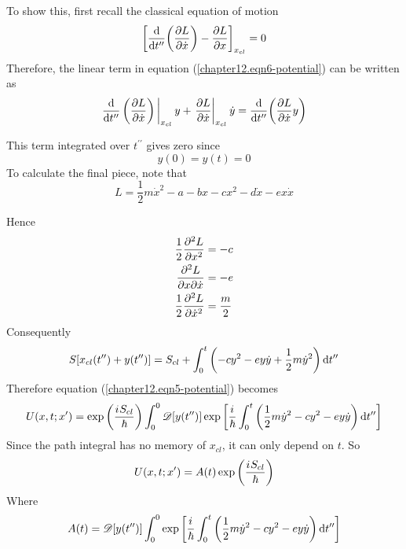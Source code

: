 		To show this, first recall the classical equation of motion
		\begin{equation}
			\left[
			\dv{t^{\prime\prime}} \qty(\pdv{L}{\dot{x}}) - \pdv{L}{x}
			\right]_{x_{cl}} = 0
		\end{equation}
		Therefore, the linear term in equation (\ref{chapter12.eqn6-potential}) can be written as
		\begin{equation}
			\eval{\dv{t^{\prime\prime}} \left(\pdv{L}{\dot{x}}\right)}_{x_{cl}} y + \eval{\pdv{L}{\dot{x}}}_{x_{cl}} \dot{y} = \dv{t^{\prime\prime}} \qty(\pdv{L}{\dot{x}} y)
		\end{equation}
		
		This term integrated over $t^{\prime\prime}$ gives zero since
		\begin{equation}
			y(0) = y(t) = 0
		\end{equation}
		To calculate the final piece, note that
		\begin{equation}
			L = \frac{1}{2} m \dot{x}^2 - a - b x - c x^2 - d \dot{x} - e x \dot{x}
			\label{chapter12.eqn7-potential}
		\end{equation}
		
		Hence
		\begin{align}
			\frac{1}{2} \pdv[2]{L}{x} &= -c \\
			\pdv[2]{L}{x}{\dot{x}} &= -e \\
			\frac{1}{2} \pdv[2]{L}{\dot{x}} &= \frac{m}{2}
		\end{align}
		Consequently
		\begin{equation}
			S\qty[x_{cl}\qty(t^{\prime\prime}) + y\qty(t^{\prime\prime})] = S_{cl} + \int_{0}^{t} \qty(-c y^2 - e y \dot{y} + \frac{1}{2} m \dot{y}^2) \dd{t^{\prime\prime}}
		\end{equation}
		Therefore equation (\ref{chapter12.eqn5-potential}) becomes
		\begin{equation}
			U\qty(x, t; x^\prime) = \exp\qty(\frac{{i\mkern1mu} S_{cl}}{\hbar}) 
			\int_{0}^{0} \mathcal{D}\qty[y\qty(t^{\prime\prime})] 
			\exp\qty[\frac{{i\mkern1mu}}{\hbar}  \int_{0}^{t} \qty(\frac{1}{2} m \dot{y}^2 - cy^2 - e y \dot{y}) \dd{t^{\prime\prime}}]
		\end{equation}
		Since the path integral has no memory of $x_{cl}$, it can only depend on $t$. So
		\begin{equation}
			U\qty(x, t; x^{\prime}) = A\qty(t) \exp\qty(\frac{{i\mkern1mu} S_{cl}}{\hbar})
			\label{chapter12.eqn8a-potential}
		\end{equation}
		Where
		\begin{equation}
			A\qty(t) = \mathcal{D}\qty[y\qty(t^{\prime\prime})] \int_0^0 \exp\qty[\frac{{i\mkern1mu}}{\hbar}  \int_{0}^{t} \qty(\frac{1}{2} m \dot{y}^2 - cy^2 - e y \dot{y}) \dd{t^{\prime\prime}}]
			\label{chapter12.eqn8b-potential}
		\end{equation}	
	
